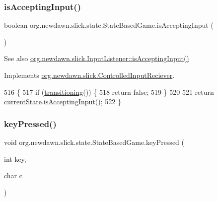\subsubsection{\texorpdfstring{is\+Accepting\+Input()}{isAcceptingInput()}}
{\footnotesize\ttfamily boolean org.\+newdawn.\+slick.\+state.\+State\+Based\+Game.\+is\+Accepting\+Input (\begin{DoxyParamCaption}{ }\end{DoxyParamCaption})\hspace{0.3cm}{\ttfamily [inline]}}

\begin{DoxySeeAlso}{See also}
\mbox{\hyperlink{interfaceorg_1_1newdawn_1_1slick_1_1_controlled_input_reciever_a380186fb0c34c11c212b72fae8186dc7}{org.\+newdawn.\+slick.\+Input\+Listener\+::is\+Accepting\+Input()}} 
\end{DoxySeeAlso}


Implements \mbox{\hyperlink{interfaceorg_1_1newdawn_1_1slick_1_1_controlled_input_reciever_a380186fb0c34c11c212b72fae8186dc7}{org.\+newdawn.\+slick.\+Controlled\+Input\+Reciever}}.


\begin{DoxyCode}
516                                       \{     
517         \textcolor{keywordflow}{if} (\mbox{\hyperlink{classorg_1_1newdawn_1_1slick_1_1state_1_1_state_based_game_ae869c08778875776081935a090d4c92f}{transitioning}}()) \{
518             \textcolor{keywordflow}{return} \textcolor{keyword}{false};
519         \}
520 
521         \textcolor{keywordflow}{return} \mbox{\hyperlink{classorg_1_1newdawn_1_1slick_1_1state_1_1_state_based_game_a6a45e68094bb9b7ec30b8a8b7d415766}{currentState}}.\mbox{\hyperlink{interfaceorg_1_1newdawn_1_1slick_1_1_controlled_input_reciever_a380186fb0c34c11c212b72fae8186dc7}{isAcceptingInput}}();
522     \}
\end{DoxyCode}
\mbox{\label{classorg_1_1newdawn_1_1slick_1_1state_1_1_state_based_game_aa75b77403a10674ff58a415d8e0c2309}} 
\subsubsection{\texorpdfstring{key\+Pressed()}{keyPressed()}}
{\footnotesize\ttfamily void org.\+newdawn.\+slick.\+state.\+State\+Based\+Game.\+key\+Pressed (\begin{DoxyParamCaption}\item[{int}]{key,  }\item[{char}]{c }\end{DoxyParamCaption})\hspace{0.3cm}{\ttfamily [inline]}}

